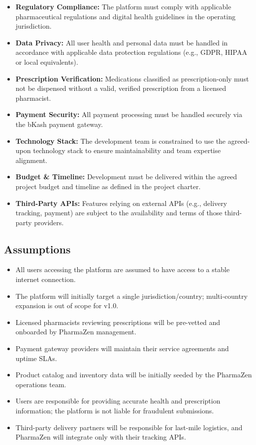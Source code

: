 \documentclass[12pt, a4paper]{article}
\begin{document}
\begin{itemize}[leftmargin=1.5em, itemsep=5pt]
  \item \textbf{Regulatory Compliance:} The platform must comply with applicable pharmaceutical regulations and digital health guidelines in the operating jurisdiction.
  \item \textbf{Data Privacy:} All user health and personal data must be handled in accordance with applicable data protection regulations (e.g., GDPR, HIPAA or local equivalents).
  \item \textbf{Prescription Verification:} Medications classified as prescription-only must not be dispensed without a valid, verified prescription from a licensed pharmacist.
  \item \textbf{Payment Security:} All payment processing must be handled securely via the bKash payment gateway.
  \item \textbf{Technology Stack:} The development team is constrained to use the agreed-upon technology stack to ensure maintainability and team expertise alignment.
  \item \textbf{Budget \& Timeline:} Development must be delivered within the agreed project budget and timeline as defined in the project charter.
  \item \textbf{Third-Party APIs:} Features relying on external APIs (e.g., delivery tracking, payment) are subject to the availability and terms of those third-party providers.
\end{itemize}

\subsection{Assumptions}

\begin{itemize}[leftmargin=1.5em, itemsep=5pt]
  \item All users accessing the platform are assumed to have access to a stable internet connection.
  \item The platform will initially target a single jurisdiction/country; multi-country expansion is out of scope for v1.0.
  \item Licensed pharmacists reviewing prescriptions will be pre-vetted and onboarded by PharmaZen management.
  \item Payment gateway providers will maintain their service agreements and uptime SLAs.
  \item Product catalog and inventory data will be initially seeded by the PharmaZen operations team.
  \item Users are responsible for providing accurate health and prescription information; the platform is not liable for fraudulent submissions.
  \item Third-party delivery partners will be responsible for last-mile logistics, and PharmaZen will integrate only with their tracking APIs.
\end{itemize}
\end{document}
